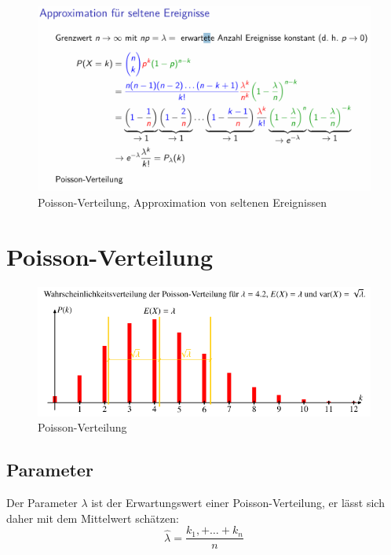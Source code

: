 \documentclass[../Main.tex]{subfiles}
\begin{document}
\begin{figure}[H]
    \centering
    \includegraphics[width=0.75\linewidth]{Images/approx-selten.png}
    \caption{Poisson-Verteilung, Approximation von seltenen Ereignissen}
\end{figure}

\newpage
\section{Poisson-Verteilung}
\begin{figure}[H]
    \centering
    \includegraphics[width=0.75\linewidth]{Images/poisson-verteilung.png}
    \caption{Poisson-Verteilung}
\end{figure}


\subsection{Parameter}
Der Parameter \(\lambda\) ist der Erwartungswert einer Poisson-Verteilung, er lässt sich daher mit dem
Mittelwert schätzen:
\begin{equation}
    \hat{\lambda} = \frac{k_1, + \dots + k_n}{n}
\end{equation}
\end{document}

